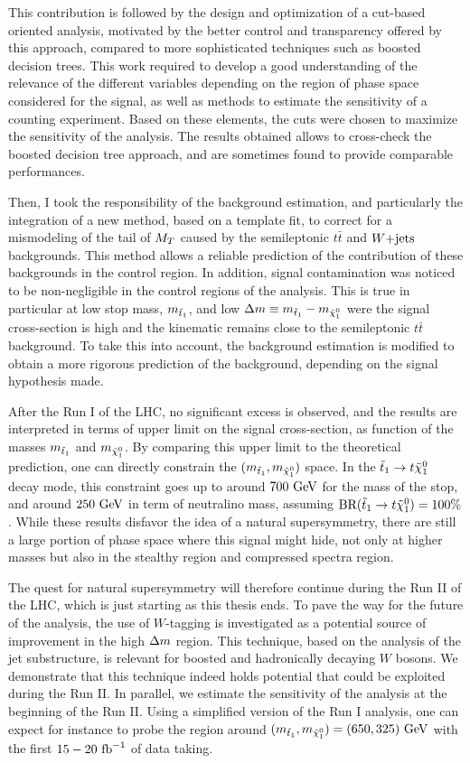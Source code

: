 This contribution is followed by the design and optimization of a cut-based
oriented analysis, motivated by the better control and transparency offered by
this approach, compared to more sophisticated techniques such as boosted
decision trees.  This work required to develop a good understanding of the
relevance of the different variables depending on the region of phase space
considered for the signal, as well as methods to estimate the sensitivity of a
counting experiment. Based on these elements, the cuts were chosen to maximize
the sensitivity of the analysis. The results obtained allows to cross-check the
boosted decision tree approach, and are sometimes found to provide comparable
performances.

Then, I took the responsibility of the background estimation, and particularly
the integration of a new method, based on a template fit, to correct for a
mismodeling of the tail of $M_T$ caused by the semileptonic $t\bar{t}$ and
$\text{$W$+jets}$ backgrounds. This method allows a reliable prediction of the
contribution of these backgrounds in the control region. In addition, signal
contamination was noticed to be non-negligible in the control regions of the
analysis. This is true in particular at low stop mass, $m_{\tilde{t}_1}$, and low
$\Delta m \equiv m_{\tilde{t}_1} - m_{\tilde{\chi}_1^0}$ were the signal
cross-section is high and the kinematic remains close to the semileptonic
$t\bar{t}$ background. To take this into account, the background estimation is
modified to obtain a more rigorous prediction of the background, depending on
the signal hypothesis made.

After the Run I of the LHC, no significant excess is observed, and the results
are interpreted in terms of upper limit on the signal cross-section, as function
of the masses $m_{\tilde{t}_1}$ and $m_{\tilde{\chi}_1^0}$. By comparing this upper
limit to the theoretical prediction, one can directly constrain the
$(m_{\tilde{t}_1},m_{\tilde{\chi}_1^0})$ space. In the $\tilde{t}_1 \rightarrow t
\tilde{\chi}_1^0$ decay mode, this constraint goes up to around $700~\text{GeV}$ for the
mass of the stop, and around $250~\text{GeV}$ in term of neutralino mass, assuming
$\text{BR}(\tilde{t}_1 \rightarrow t \tilde{\chi}_1^0) = 100\%$. While these results
disfavor the idea of a natural supersymmetry, there are still a large portion of
phase space where this signal might hide, not only at higher masses but also in
the stealthy region and compressed spectra region.

The quest for natural supersymmetry will therefore continue during the Run II of
the LHC, which is just starting as this thesis ends. To pave the way for the
future of the analysis, the use of $W$-tagging is investigated as a potential
source of improvement in the high $\Delta m$ region. This technique, based on the
analysis of the jet substructure, is relevant for boosted and hadronically
decaying $W$ bosons. We demonstrate that this technique indeed holds potential
that could be exploited during the Run II. In parallel, we estimate the
sensitivity of the analysis at the beginning of the Run II. Using a simplified
version of the Run I analysis, one can expect for instance to probe the region
around $(m_{\tilde{t}_1},m_{\tilde{\chi}_1^0}) = (650,325)~\text{GeV}$ with the first
$15-20~\text{fb}^{-1}$ of data taking.

